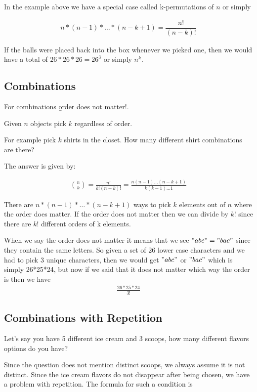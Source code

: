 \documentclass[12pt, titlepage, oneside]{article}
\begin{document}
In the example above we have a special case called k-permutations of $n$ or simply 

\begin{align}
n * (n-1) * \dots * (n-k+1) = \dfrac{n!}{(n-k)!}
\end{align}

If the balls were placed back into the box whenever we picked one, then we would have a total of $26*26*26 = 26^3$ or simply $n^k$.

\subsection{Combinations}

For combinations \b{order does not matter}!. 

Given $n$ objects pick $k$ regardless of order.  

For example pick $k$ shirts in the closet. How many different shirt combinations are there?

The answer is given by:

\begin{align*}
{n \choose k} = \frac{n!}{k!(n-k)!} = \frac{n(n-1)\dots (n-k+1)}{k(k-1)\dots1}
\end{align*}

There are $n * (n-1) * \dots * (n-k+1)$ ways to pick $k$ elements out of $n$ where the order does matter. If the order does not matter then we can divide by $k!$ since there are $k!$ different orders of k elements.

When we say the order does not matter it means that we see $"abc" = "bac"$ since they contain the same letters. So given a set of 26 lower case characters and we had to pick 3 unique characters, then we would get $"abc"$ or $"bac"$ which is simply 26*25*24, but now if we said that it does not matter which way the order is then we have
\begin{align*}
 \frac{26*25*24}{3!}
\end{align*}


\subsection{Combinations with Repetition}

Let's say you have 5 different ice cream and 3 scoops, how many different flavors options do you have?

Since the question does not mention distinct scoops, we always assume it is not distinct. Since the ice cream flavors do not disappear after being chosen, we have a problem with repetition. The formula for such a condition is
\end{document}
